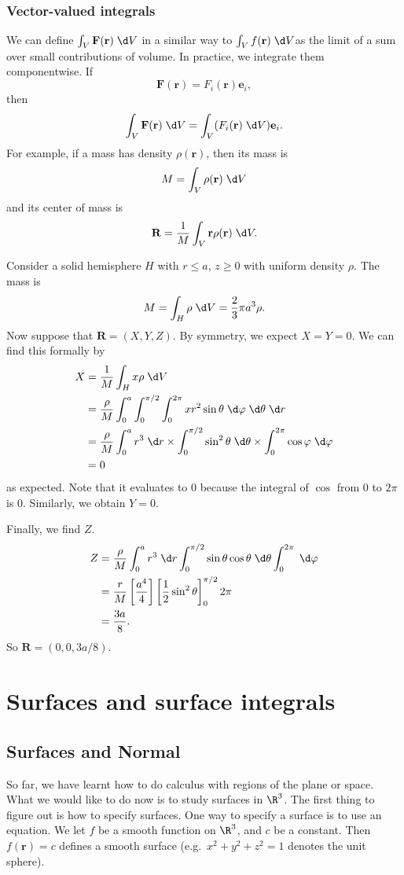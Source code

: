 \documentclass[a4paper]{article}
\begin{document}
\subsubsection*{Vector-valued integrals}
We can define $\int_V \mathbf{F}(\mathbf{r})\;\d V$ in a similar way to $\int_V f(\mathbf{r})\;\d V$as the limit of a sum over small contributions of volume. In practice, we integrate them componentwise. If
\[
  \mathbf{F}(\mathbf{r}) = F_{i}(\mathbf{r})\mathbf{e}_i,
\]
then
\[
  \int_V \mathbf{F}(\mathbf{r})\;\d V = \int_V (F_i(\mathbf{r})\;\d V)\mathbf{e}_i.
\]
For example, if a mass has density $\rho (\mathbf{r})$, then its mass is
\[
  M = \int_V \rho(\mathbf{r})\;\d V
\]
and its center of mass is
\[
  \mathbf{R} = \frac{1}{M}\int_V \mathbf{r}\rho (\mathbf{r})\;\d V.
\]
\begin{eg}
  Consider a solid hemisphere $H$ with $r \leq a$, $z \geq 0$ with uniform density $\rho$. The mass is
  \[
    M = \int_H \rho \;\d V = \frac{2}{3}\pi a^3\rho.
  \]
  Now suppose that $\mathbf{R} = (X, Y, Z)$. By symmetry, we expect $X = Y = 0$. We can find this formally by
  \begin{align*}
    X &= \frac{1}{M}\int_H x\rho \;\d V\\
    &= \frac{\rho}{M}\int_0^a \int_0^{\pi/2}\int_0^{2\pi}xr^2 \sin \theta\;\d \varphi\;\d \theta\;\d r\\
    &= \frac{\rho}{M}\int_0^{a}r^3\;\d r\times \int_0^{\pi/2}\sin^2\theta\;\d \theta\times \int_0^{2\pi}\cos\varphi\;\d \varphi\\
    &= 0
  \end{align*}
  as expected. Note that it evaluates to 0 because the integral of $\cos$ from $0$ to $2\pi$ is 0. Similarly, we obtain $Y = 0$.

  Finally, we find $Z$.
  \begin{align*}
    Z &= \frac{\rho}{M}\int_0^a r^3\;\d r \int_0^{\pi/2}\sin\theta\cos\theta\;\d \theta \int_0^{2\pi}\;\d \varphi\\
    &= \frac{r}{M}\left[\frac{a^4}{4}\right]\left[\frac{1}{2}\sin^2\theta\right]_0^{\pi/2}2\pi\\
    &= \frac{3a}{8}.
  \end{align*}
  So $\mathbf{R} = (0, 0, 3a/8)$.
\end{eg}

\section{Surfaces and surface integrals}
\subsection{Surfaces and Normal}
So far, we have learnt how to do calculus with regions of the plane or space. What we would like to do now is to study surfaces in $\R^3$. The first thing to figure out is how to specify surfaces. One way to specify a surface is to use an equation. We let $f$ be a smooth function on $\R^3$, and $c$ be a constant. Then $f(\mathbf{r}) = c$ defines a smooth surface (e.g.\ $x^2 + y^2 + z^2 = 1$ denotes the unit sphere).
\end{document}
